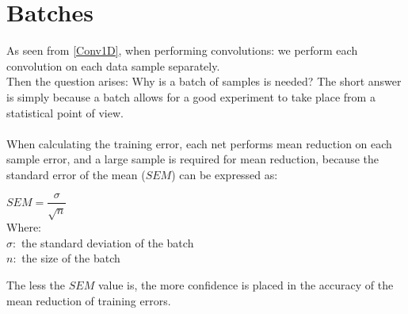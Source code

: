 \documentclass[a4paper, 12pt]{report}
\newcommand\tab[1][1cm]{\hspace*{#1}}
\begin{document}
\section{\textbf{Batches}}
As seen from \cref{Conv1D}, when performing convolutions: we perform each convolution on each data sample separately.\\
Then the question arises: Why is a batch of samples is needed?
The short answer is simply because a batch allows for a good experiment to take place from a statistical point of view.\\\\
When calculating the training error, each net performs mean reduction on each sample error, and a large sample is required for mean reduction, because the standard error of the mean ($ SEM $) can be expressed as:\\
\begin{center}
	\begin{minipage}{0.5\textwidth}
	$ SEM = \dfrac{\sigma}{\sqrt{n}} $\\
	Where:\\
	\tab \space \space $ \sigma: $ the standard deviation of the batch \\
	\tab \space \space $ n: $ the size of the batch 
\end{minipage}
\end{center}
The less the $ SEM $ value is, the more confidence is placed in the accuracy of the mean reduction of training errors.
\end{document}
